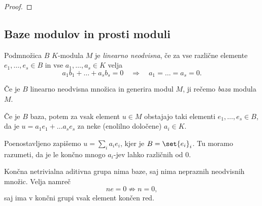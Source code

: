 \begin{definicija}
    
\end{definicija}

\begin{primer}
    
\end{primer}

\begin{definicija}
    
\end{definicija}

\begin{lema}
    
\end{lema}

\begin{proof}
    
\end{proof}

\begin{definicija}
    
\end{definicija}


\subsection{Baze modulov in prosti moduli}

\begin{definicija}
    Podmnožica $B$ $K$-modula $M$ je \emph{linearno neodvisna}, če 
    za vse različne elemente $e_1, \dots, e_s \in B$ in vse $a_1, \dots, a_s \in K$ velja
    \[
        a_1b_1 + \dots + a_sb_s = 0 \quad \Rightarrow \quad a_1 = \dots = a_s = 0.
    \]
\end{definicija}

\begin{definicija}
    Če je $B$ linearno neodvisna množica in generira modul $M$, ji rečemo \emph{baza}
    modula $M$.
\end{definicija}

Če je $B$ baza, potem za vsak element $u \in M$ obstajajo taki elementi $e_1, \dots, e_s \in B$,
da je $u = a_1e_1 + \dots a_se_s$ za neke (enolilno določene) $a_i \in K$.

Poenostavljeno zapišemo $u = \sum_i a_i e_i$, kjer je $B = \set{e_i}_i$. Tu moramo razumeti, 
da je le končno mnogo $a_i$-jev lahko različnih od $0$.

\begin{primer}
    Končna netrivialna aditivna grupa nima baze, saj nima nepraznih neodvisnih množic. Velja namreč
    \[
        ne = 0 \not\Rightarrow n = 0, 
    \]
    saj ima v končni grupi vsak element končen red.
\end{primer}

